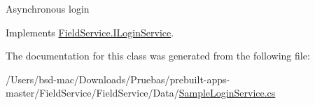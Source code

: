 Asynchronous login 



Implements \hyperlink{interface_field_service_1_1_i_login_service_a1e82d7033555800002f016ddb020f6df}{Field\+Service.\+I\+Login\+Service}.



The documentation for this class was generated from the following file\+:\begin{DoxyCompactItemize}
\item 
/\+Users/bsd-\/mac/\+Downloads/\+Pruebas/prebuilt-\/apps-\/master/\+Field\+Service/\+Field\+Service/\+Data/\hyperlink{_sample_login_service_8cs}{Sample\+Login\+Service.\+cs}\end{DoxyCompactItemize}
